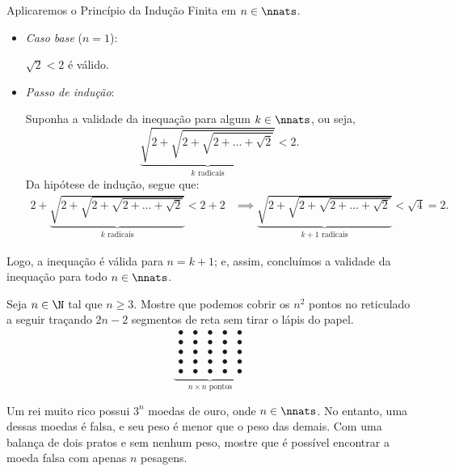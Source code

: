 \begin{solution}
Aplicaremos o Princípio da Indução Finita em $n \in \nnats$.
%
\begin{itemize}
	\item \textit{Caso base} ($n=1$):

	$\sqrt 2 < 2$ é válido.

	\item \textit{Passo de indução}:

	Suponha a validade da inequação para algum $k \in \nnats$, ou seja, 
	\begin{equation*}
	\underbrace{\sqrt{2+\sqrt{2+\sqrt{2+ \dots + \sqrt 2}}}}_{k  \text{ radicais}} < 2.
	\end{equation*}
	Da hipótese de indução, segue que:
	\begin{align*}
	2+\underbrace{\sqrt{2+\sqrt{2+\sqrt{2+ \dots + \sqrt 2}}}}_{k  \text{ radicais}} < 2+2 & \implies \underbrace{\sqrt{2+\sqrt{2+\sqrt{2+ \dots + \sqrt 2}}}}_{k+1  \text{ radicais}} < \sqrt 4 = 2.
	\end{align*}
\end{itemize}
%
Logo, a inequação é válida para $n = k+1$; e, assim, concluímos a validade da inequação para todo $n \in \nnats$.
\end{solution}

\begin{example}
Seja $n \in \N$ tal que $n\ge 3$. Mostre  que podemos cobrir os $n^2$ pontos no reticulado a seguir traçando $2n-2$ segmentos de reta sem tirar o lápis do papel.
%
\begin{equation*}
\underbrace{\begin{array}{ccccc}
                \bullet & \bullet & \bullet & \bullet & \bullet \\
                \bullet & \bullet & \bullet & \bullet & \bullet \\
                \bullet & \bullet & \bullet & \bullet & \bullet \\
                \bullet & \bullet & \bullet & \bullet & \bullet \\
                \bullet & \bullet & \bullet & \bullet & \bullet
              \end{array}
}_{n \times n \text{ pontos}}
\end{equation*}
\end{example}

\begin{example}
Um rei muito rico possui $3^n$ moedas de ouro, onde $n \in \nnats$. No entanto, uma dessas moedas é falsa, e seu peso é menor que o peso das demais. Com uma balança de dois pratos e sem nenhum peso, mostre que é possível encontrar a moeda falsa com apenas $n$ pesagens.
\end{example}

